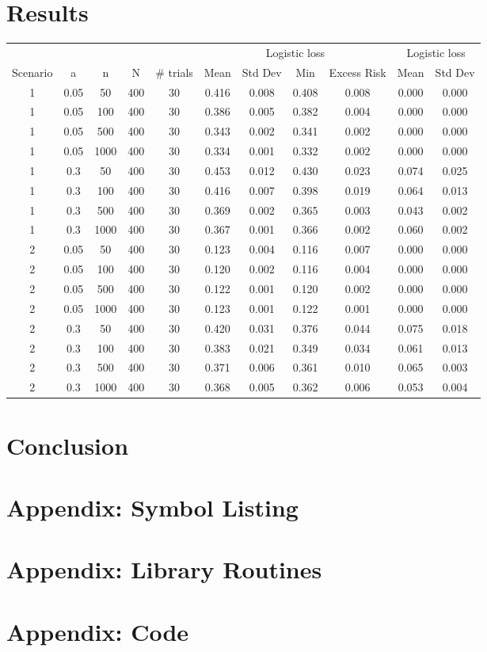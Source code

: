 \documentclass[11pt]{article}
\begin{document}
\section{Results}
\begin{tabular}{c|c|c|c|c|c|c|c|c|c|c} 
\multicolumn{5}{c}{}             &  \multicolumn{4}{c}{Logistic loss}        & \multicolumn{2}{c}{Logistic loss} \\
{Scenario} & {a}   & {n}  & {N}  & {\# trials} & {Mean} & {Std Dev} & {Min} & {Excess Risk} & {Mean} & {Std Dev} \\ \hline
1 & 0.05 & 50 & 400 & 30 & 0.416 & 0.008 & 0.408 & 0.008 & 0.000 & 0.000 \\
1 & 0.05 & 100 & 400 & 30 & 0.386 & 0.005 & 0.382 & 0.004 & 0.000 & 0.000 \\
1 & 0.05 & 500 & 400 & 30 & 0.343 & 0.002 & 0.341 & 0.002 & 0.000 & 0.000 \\
1 & 0.05 & 1000 & 400 & 30 & 0.334 & 0.001 & 0.332 & 0.002 & 0.000 & 0.000 \\ \hline
1 & 0.3 & 50 & 400 & 30 & 0.453 & 0.012 & 0.430 & 0.023 & 0.074 & 0.025 \\
1 & 0.3 & 100 & 400 & 30 & 0.416 & 0.007 & 0.398 & 0.019 & 0.064 & 0.013 \\
1 & 0.3 & 500 & 400 & 30 & 0.369 & 0.002 & 0.365 & 0.003 & 0.043 & 0.002 \\
1 & 0.3 & 1000 & 400 & 30 & 0.367 & 0.001 & 0.366 & 0.002 & 0.060 & 0.002 \\ \hline
2 & 0.05 & 50 & 400 & 30 & 0.123 & 0.004 & 0.116 & 0.007 & 0.000 & 0.000 \\
2 & 0.05 & 100 & 400 & 30 & 0.120 & 0.002 & 0.116 & 0.004 & 0.000 & 0.000 \\
2 & 0.05 & 500 & 400 & 30 & 0.122 & 0.001 & 0.120 & 0.002 & 0.000 & 0.000 \\
2 & 0.05 & 1000 & 400 & 30 & 0.123 & 0.001 & 0.122 & 0.001 & 0.000 & 0.000 \\ \hline
2 & 0.3 & 50 & 400 & 30 & 0.420 & 0.031 & 0.376 & 0.044 & 0.075 & 0.018 \\
2 & 0.3 & 100 & 400 & 30 & 0.383 & 0.021 & 0.349 & 0.034 & 0.061 & 0.013 \\
2 & 0.3 & 500 & 400 & 30 & 0.371 & 0.006 & 0.361 & 0.010 & 0.065 & 0.003 \\
2 & 0.3 & 1000 & 400 & 30 & 0.368 & 0.005 & 0.362 & 0.006 & 0.053 & 0.004 \\

  
\end{tabular}

\section{Conclusion}

\appendix
\section{Appendix: Symbol Listing}

\section{Appendix: Library Routines}

\section{Appendix: Code}
\end{document}

